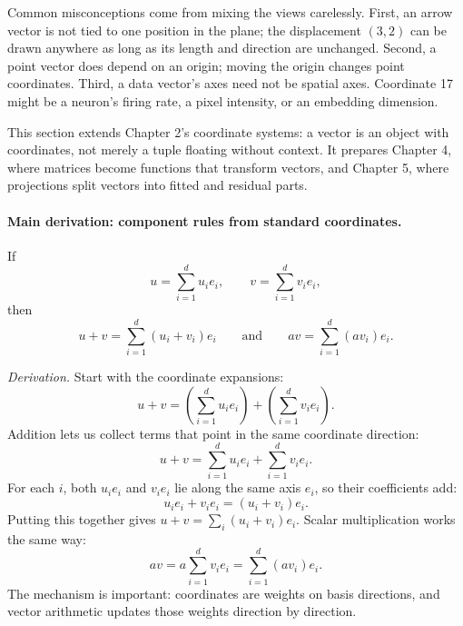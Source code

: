 Common misconceptions come from mixing the views carelessly. First, an arrow vector is not tied to one position in the plane; the displacement \((3,2)\) can be drawn anywhere as long as its length and direction are unchanged. Second, a point vector does depend on an origin; moving the origin changes point coordinates. Third, a data vector's axes need not be spatial axes. Coordinate 17 might be a neuron's firing rate, a pixel intensity, or an embedding dimension.

This section extends Chapter 2's coordinate systems: a vector is an object with coordinates, not merely a tuple floating without context. It prepares Chapter 4, where matrices become functions that transform vectors, and Chapter 5, where projections split vectors into fitted and residual parts.

\paragraph{Main derivation: component rules from standard coordinates.}
If
\[
u=\sum_{i=1}^d u_i e_i,
\qquad
v=\sum_{i=1}^d v_i e_i,
\]
then
\[
u+v=\sum_{i=1}^d (u_i+v_i)e_i
\qquad\text{and}\qquad
av=\sum_{i=1}^d (av_i)e_i.
\]

\emph{Derivation.} Start with the coordinate expansions:
\[
u+v=\left(\sum_{i=1}^d u_i e_i\right)+\left(\sum_{i=1}^d v_i e_i\right).
\]
Addition lets us collect terms that point in the same coordinate direction:
\[
u+v=\sum_{i=1}^d u_i e_i+\sum_{i=1}^d v_i e_i.
\]
For each \(i\), both \(u_i e_i\) and \(v_i e_i\) lie along the same axis \(e_i\), so their coefficients add:
\[
u_i e_i+v_i e_i=(u_i+v_i)e_i.
\]
Putting this together gives \(u+v=\sum_i (u_i+v_i)e_i\). Scalar multiplication works the same way:
\[
av=a\sum_{i=1}^d v_i e_i=\sum_{i=1}^d (av_i)e_i.
\]
The mechanism is important: coordinates are weights on basis directions, and vector arithmetic updates those weights direction by direction.

